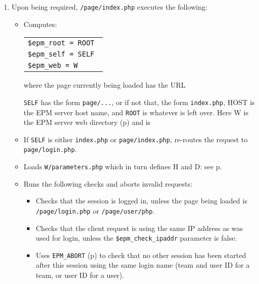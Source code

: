 \documentclass[12pt]{article}
\newcommand{\EOL}{\penalty \exhyphenpenalty}
\newcommand{\pagref}[1]{p\pageref{#1}}
\begin{document}
\begin{enumerate}
\begin{itemize}
\end{itemize}

\item Upon being required, {\tt /page/index.php} executes the
      following:
\begin{itemize}
\item Computes:

      \hspace*{0.2in}\begin{tabular}{l}
		\tt \$epm\_root = ROOT \\
		\tt \$epm\_self = SELF \\
		\tt \$epm\_web = W \\
		\end{tabular}

       where the page currently being loaded has the URL

       \hspace*{0.2in}{\tt http://HOST/ROOT/SELF}

       {\tt SELF} has the form {\tt page/...}, or if
       not that, the form {\tt index.php}, HOST is the
       EPM server host name, and {\tt ROOT} is whatever
       is left over.  Here W is the EPM server web directory
       (\pagref{W-DIRECTORY}) and is

       \hspace*{0.2in}{\tt \$\_SERVER['DOCUMENT\_ROOT'] . ROOT}

\item If {\tt SELF} is either {\tt index.php} or {\tt page/index.php},
      re-routes the request to {\tt page/\EOL login.php}.

\item Loads {\tt W/parameters.php} which in turn defines H and D:
      see \pagref{MAIN-DIRECTORIES}.

\item Runs the following checks and aborts invalid requests:
\begin{itemize}
\item Checks that the session is logged in, unless the page being
loaded is {\tt /page/\EOL login.php} or {\tt /page/user/php}.
\item Checks that the client request is using the same IP
address as was used for login, unless the {\tt \$epm\_check\_ipaddr}
parameter is false.
\item Uses {\tt EPM\_ABORT} (\pagref{EPM_ABORT}) to check that
no other session has been started after this session using the
same login name (team and user ID for a team, or user ID for a user).
\end{itemize}


\end{itemize}
\end{enumerate}
\end{document}
